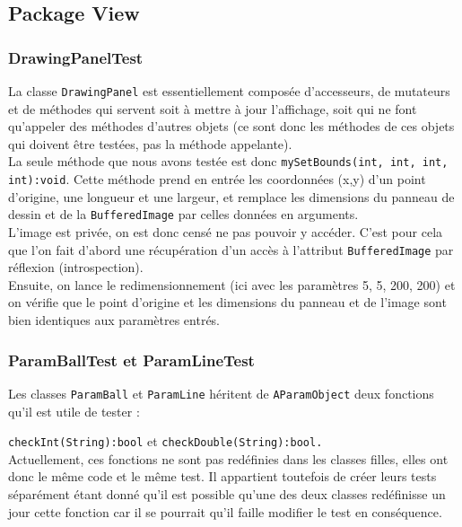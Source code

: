 \documentclass{report}
\begin{document}
\subsection{Package View}

\subsubsection{DrawingPanelTest}

La classe \texttt{DrawingPanel} est essentiellement composée d’accesseurs, de mutateurs et de méthodes qui servent soit à mettre à jour l’affichage, soit qui ne font qu’appeler des méthodes d’autres objets (ce sont donc les méthodes de ces objets qui doivent être testées, pas la méthode appelante). \\

La seule méthode que nous avons testée est donc \texttt{mySetBounds(int, int, int, int):void}. Cette méthode prend en entrée les coordonnées (x,y) d’un point d’origine, une longueur et une largeur, et remplace les dimensions du panneau de dessin et de la \texttt{BufferedImage} par celles données en arguments. \\

L’image est privée, on est donc censé ne pas pouvoir y accéder. C’est pour cela que l’on fait d’abord une récupération d’un accès à l’attribut \texttt{BufferedImage} par réflexion (introspection). \\

Ensuite, on lance le redimensionnement (ici avec les paramètres 5, 5, 200, 200) et on vérifie que le point d’origine et les dimensions du panneau et de l’image sont bien identiques aux paramètres entrés.

\subsubsection{ParamBallTest et ParamLineTest}

Les classes \texttt{ParamBall} et \texttt{ParamLine} héritent de \texttt{AParamObject} deux fonctions qu’il est utile de tester :

\texttt{checkInt(String):bool} et \texttt{checkDouble(String):bool.} \\

Actuellement, ces fonctions ne sont pas redéfinies dans les classes filles, elles ont donc le même code et le même test. Il appartient toutefois de créer leurs tests séparément étant donné qu’il est possible qu’une des deux classes redéfinisse un jour cette fonction car il se pourrait qu’il faille modifier le test en conséquence. \\
\end{document}
